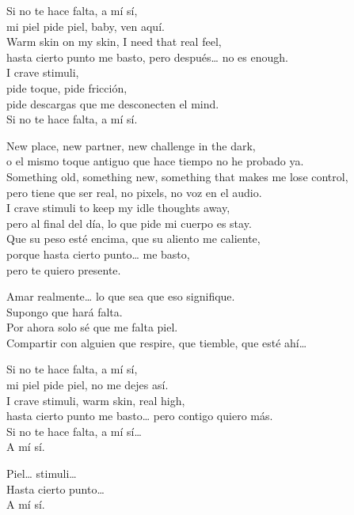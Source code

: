 \begin{lyrics}
Si no te hace falta, a mí sí,\\
mi piel pide piel, baby, ven aquí.\\
Warm skin on my skin, I need that real feel,\\
hasta cierto punto me basto, pero después… no es enough.\\
I crave stimuli,\\
pide toque, pide fricción,\\
pide descargas que me desconecten el mind.\\
Si no te hace falta, a mí sí.

New place, new partner, new challenge in the dark,\\
o el mismo toque antiguo que hace tiempo no he probado ya.\\
Something old, something new, something that makes me lose control,\\
pero tiene que ser real, no pixels, no voz en el audio.\\
I crave stimuli to keep my idle thoughts away,\\
pero al final del día, lo que pide mi cuerpo es stay.\\
Que su peso esté encima, que su aliento me caliente,\\
porque hasta cierto punto… me basto,\\
pero te quiero presente.

Amar realmente… lo que sea que eso signifique.\\
Supongo que hará falta.\\
Por ahora solo sé que me falta piel.\\
Compartir con alguien que respire, que tiemble, que esté ahí…

Si no te hace falta, a mí sí,\\
mi piel pide piel, no me dejes así.\\
I crave stimuli, warm skin, real high,\\
hasta cierto punto me basto… pero contigo quiero más.\\
Si no te hace falta, a mí sí…\\
A mí sí.

Piel… stimuli…\\
Hasta cierto punto…\\
A mí sí.
\end{lyrics}

